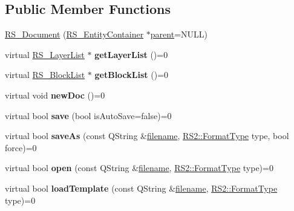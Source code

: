 \subsection*{Public Member Functions}
\begin{DoxyCompactItemize}
\item 
\hyperlink{classRS__Document_ad4f493b59861514e06835437d83fae7e}{R\-S\-\_\-\-Document} (\hyperlink{classRS__EntityContainer}{R\-S\-\_\-\-Entity\-Container} $\ast$\hyperlink{classRS__Entity_a80358a8d2fc6739a516a278dc500b49f}{parent}=N\-U\-L\-L)
\item 
\hypertarget{classRS__Document_ab4db71a9596d9e70d36e7b81034a3d79}{virtual \hyperlink{classRS__LayerList}{R\-S\-\_\-\-Layer\-List} $\ast$ {\bfseries get\-Layer\-List} ()=0}\label{classRS__Document_ab4db71a9596d9e70d36e7b81034a3d79}

\item 
\hypertarget{classRS__Document_a03a5d6a959d006c53d003401ffd19980}{virtual \hyperlink{classRS__BlockList}{R\-S\-\_\-\-Block\-List} $\ast$ {\bfseries get\-Block\-List} ()=0}\label{classRS__Document_a03a5d6a959d006c53d003401ffd19980}

\item 
\hypertarget{classRS__Document_aef497824f140c3a63f66c6baca718ebe}{virtual void {\bfseries new\-Doc} ()=0}\label{classRS__Document_aef497824f140c3a63f66c6baca718ebe}

\item 
\hypertarget{classRS__Document_a8a327696ee7f94d50b3f467192d28472}{virtual bool {\bfseries save} (bool is\-Auto\-Save=false)=0}\label{classRS__Document_a8a327696ee7f94d50b3f467192d28472}

\item 
\hypertarget{classRS__Document_abdf2e9eca1cebf9d83434c9a9356177a}{virtual bool {\bfseries save\-As} (const Q\-String \&\hyperlink{classRS__Document_aefd3d25d96ec31943bdfd1453031a423}{filename}, \hyperlink{classRS2_a077a6c94c9a0ab9962c4d4a612c7189b}{R\-S2\-::\-Format\-Type} type, bool force)=0}\label{classRS__Document_abdf2e9eca1cebf9d83434c9a9356177a}

\item 
\hypertarget{classRS__Document_a1d5614f0d8a703f53e66f226d8a7fd7a}{virtual bool {\bfseries open} (const Q\-String \&\hyperlink{classRS__Document_aefd3d25d96ec31943bdfd1453031a423}{filename}, \hyperlink{classRS2_a077a6c94c9a0ab9962c4d4a612c7189b}{R\-S2\-::\-Format\-Type} type)=0}\label{classRS__Document_a1d5614f0d8a703f53e66f226d8a7fd7a}

\item 
\hypertarget{classRS__Document_a706d60b8d7c40b43466bfa25aa26c5d3}{virtual bool {\bfseries load\-Template} (const Q\-String \&\hyperlink{classRS__Document_aefd3d25d96ec31943bdfd1453031a423}{filename}, \hyperlink{classRS2_a077a6c94c9a0ab9962c4d4a612c7189b}{R\-S2\-::\-Format\-Type} type)=0}\label{classRS__Document_a706d60b8d7c40b43466bfa25aa26c5d3}


\end{DoxyCompactItemize}
